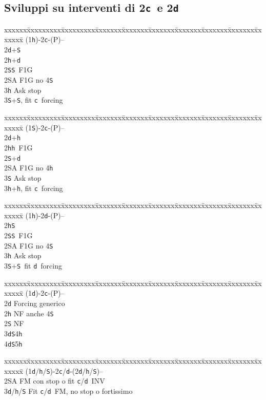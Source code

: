 \documentclass[a4paper,italian]{article}
\newcommand{\BS}{\small{\texttt{S}}}
\newcommand{\BC}{\small{\texttt{c}}}
\newcommand{\BD}{\small{\texttt{d}}}
\newcommand{\BH}{\small{\texttt{h}}}
\newcommand{\pdfc}{\texorpdfstring{\texttt{c}}{C}}
\newcommand{\pdfd}{\texorpdfstring{\texttt{d}}{D}}
\newenvironment{bidtable}
{\begin{tabbing}

    xxxxxx\=xxxxxxxxx\=xxxxxxxxx\=xxxxxxx\=xxxxxxx\=xxxxxxx\=xxxxxxx\=xxxxxxx\=xxxxxxx\=xxxxxxx\=\kill}
{\end{tabbing} }%
\begin{document}
\begin{multicols}{2}

    \subsection{Sviluppi su interventi di 2\pdfc\ e 2\pdfd}

    \begin{bidtable}
        (1\BH)-2\BC-(P)--\+\\
        2\BD {}+\BS\\
        2\BH {}+\BD \\
        2\BS {}\BS\ F1G\\
        2\small{SA} \> F1G no 4\BS\\
        3\BH \> Ask stop\\
        3\BS {}+\BS, fit \BC\ forcing
    \end{bidtable}
    \begin{bidtable}
        (1\BS)-2\BC-(P)--\+\\
        2\BD {}+\BH\\
        2\BH {}\BH\ F1G\\
        2\BS {}+\BD \\
        2\small{SA} \> F1G no 4\BH\\
        3\BS \> Ask stop\\
        3\BH {}+\BH, fit \BC\ forcing
    \end{bidtable}

    \begin{bidtable}
        (1\BH)-2\BD-(P)--\+\\
        2\BH {}\BS \\
        2\BS {}\BS\ F1G\\
        2\small{SA} \> F1G no 4\BS \\
        3\BH \> Ask stop\\
        3\BS {}+\BS\ fit \BD\ forcing
    \end{bidtable}
    \begin{bidtable}
        (1\BD)-2\BC-(P)--\+\\
        2\BD \> Forcing generico\\
        2\BH \> NF anche 4\BS \\
        2\BS \> NF\\
        3\BD {}\BS 4\BH \\
        4\BD {}\BS 5\BH
    \end{bidtable}
    \begin{bidtable}
        (1\BD/\BH/\BS)-2\BC/\BD-(2\BD/\BH/\BS)--\+\\
        2\small{SA} \> FM con stop o fit \BC/\BD\ INV\\
        3\BD/\BH/\BS \> Fit \BC/\BD\ FM, no stop o fortissimo\\
    \end{bidtable}
    \vfill\null
    \columnbreak


\end{multicols}
\end{document}
